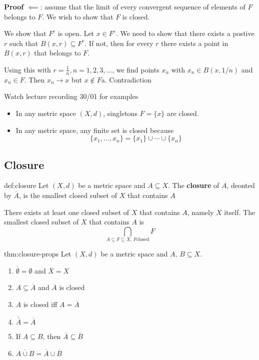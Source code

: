 \documentclass[landscape, 8pt]{extarticle}
\begin{document}
\begin{multicols}{3}
\textbf{Proof $\impliedby$}: assume that the limit of every convergent sequence of elements of $F$ belongs to $F$. We wish to show that $F$ is closed.

We show that $F^{c}$ is open. Let $x\in F^{c}$. We need to show that there exists a postive $r$ such that $B(x,r)\subseteq F^{c}$. If not, then for every $r$ there exists a point in $B(x,r)$ that belongs to $F$.

Using this with $r = \frac{1}{n}, n=1,2,3,\dots$, we find points $x_{n}$ with $x_{n}\in B(x, 1 / n)$ and $x_{n}\in F$. Then $x_{n}\to x$ but $x\not\in F$a. Contradiction

Watch lecture recording 30/01 for examples

\begin{itemize}
    \item In any metric space $(X,d)$, singletons $F = \{x\}$ are closed.
    \item In any metric space, any finite set is closed because
        \[\{x_{1},\dots,x_{n}\} = \{x_{1}\}\cup \cdots \cup \{x_{n}\}\]
\end{itemize}


\subsection{Closure}

\begin{dfn}[Closure]{def:closure}{}
    Let $(X, d)$ be a metric space and $A \subseteq X$. The \textbf{closure} of $A$, deonted by $\overline{A}$, is the smallest closed subset of $X$ that contains $A$

    There exists at least one closed subset of $X$ that contains $A$, namely $X$ itself. The smallest closed subset of $X$ that contains $A$ is
    \[\bigcap\limits_{A \subseteq F \subseteq X,\,F \text{closed}} F\]
\end{dfn}

\begin{thm}{thm:closure-props}{}
    Let $(X, d)$ be a metric space and $A,\,B \subseteq X$.
    \begin{enumerate}
        \item $\overline{\emptyset} = \emptyset$ and $\overline{X} = X$
        \item $A \subseteq \overline{A}$ and $\overline{A}$ is closed
        \item $A$ is closed iff $A = \overline{A}$
        \item $\overline{\overline{A}} = \overline{A}$
        \item If $A \subseteq B$, then $\overline{A} \subseteq \overline{B}$
        \item $\overline{A \cup B} = \overline{A} \cup \overline{B}$
    \end{enumerate}
\end{thm}


\end{multicols}
\end{document}
